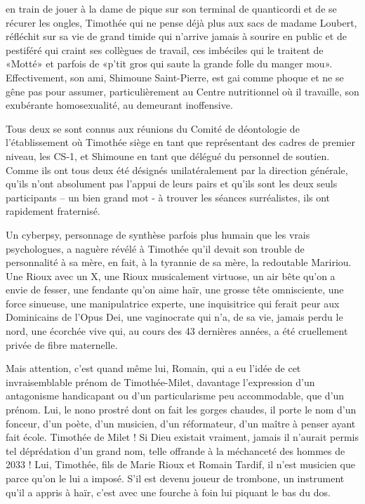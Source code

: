  {en train de jouer à la dame de pique sur son terminal de quanticordi et de se récurer les ongles, Timothée qui ne pense déjà plus aux sacs de madame Loubert, réfléchit sur sa vie de grand timide qui n’arrive jamais à sourire en public et de pestiféré qui craint ses collègues de travail, ces imbéciles qui le traitent de «Motté» et parfois de «p’tit gros qui saute la grande folle du manger mou». Effectivement, son ami, Shimoune Saint-Pierre, est gai comme phoque et ne se gêne pas pour assumer, particulièrement au Centre nutritionnel où il travaille, son exubérante homosexualité, au demeurant inoffensive.}

Tous deux se sont connus aux réunions du Comité de déontologie de l’établissement où Timothée siège en tant que représentant des cadres de premier niveau, les CS-1, et Shimoune en tant que délégué du personnel de soutien. Comme ils ont tous deux été désignés unilatéralement par la direction générale, qu’ils n’ont absolument pas l’appui de leurs pairs et qu’ils sont les deux seuls participants – un bien grand mot - à trouver les séances surréalistes, ils ont rapidement fraternisé.

Un cyberpsy, personnage de synthèse parfois plus humain que les vrais psychologues, a naguère révélé à Timothée qu’il devait son trouble de personnalité à sa mère, en fait, à la tyrannie de sa mère, la redoutable Maririou. Une Rioux avec un X, une Rioux musicalement virtuose, un air bête qu’on a envie de fesser, une fendante qu’on aime haïr, une grosse tête omnisciente, une force sinueuse, une manipulatrice experte, une inquisitrice qui ferait peur aux Dominicains de l’Opus Dei, une vaginocrate qui n’a, de sa vie, jamais perdu le nord, une écorchée vive qui, au cours des 43 dernières années, a été cruellement privée de fibre maternelle.

Mais attention, c’est quand même lui, Romain, qui a eu l’idée de cet invraisemblable prénom de Timothée-Milet, davantage l’expression d’un antagonisme handicapant ou d’un particularisme peu accommodable, que d’un prénom. Lui, le nono prostré dont on fait les gorges chaudes, il porte le nom d’un fonceur, d’un poète, d’un musicien, d’un réformateur, d’un maître à penser ayant fait école. Timothée de Milet ! Si Dieu existait vraiment, jamais il n’aurait permis tel déprédation d’un grand nom, telle offrande à la méchanceté des hommes de 2033 ! Lui, Timothée, fils de Marie Rioux et Romain Tardif, il n’est musicien que parce qu’on le lui a imposé. S’il est devenu joueur de trombone, un instrument qu’il a appris à haïr, c’est avec une fourche à foin lui piquant le bas du dos.


